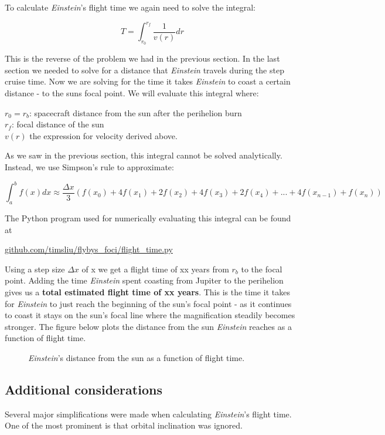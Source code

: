 \documentclass[12pt]{article} %
\begin{document}
To calculate \textit{Einstein}'s flight time we again need to solve the integral:

$$T = \int_{r_0}^{r_f} \frac{1}{v(r)} dr$$

This is the reverse of the problem we had in the previous section. In the last section we needed to solve for a distance that \textit{Einstein} travels during the step cruise time. Now we are solving for the time it takes \textit{Einstein} to coast a certain distance - to the suns focal point. We will evaluate this integral where:

$r_0 = r_b$: spacecraft distance from the sun after the perihelion burn\\
$r_f$: focal distance of the sun\\
$v(r)$ the expression for velocity derived above.

As we saw in the previous section, this integral cannot be solved analytically. Instead, we use Simpson's rule to approximate:

$$\int_a^b f(x) dx \approx \frac{\Delta x}{3} (f(x_0) + 4f(x_1)+ 2f(x_2) + 4f(x_3) + 2 f(x_4) + ... + 4f(x_{n-1}) + f(x_n))$$

The Python program used for numerically evaluating this integral can be found at 

\url{github.com/timsliu/flybys_foci/flight_time.py}

Using a step size $\Delta x$ of x we get a flight time of xx years from $r_b$ to the focal point. Adding the time \textit{Einstein} spent coasting from Jupiter to the perihelion gives us a \textbf{total estimated flight time of xx years}. This is the time it takes for \textit{Einstein} to just reach the beginning of the sun's focal point - as it continues to coast it stays on the sun's focal line where the magnification steadily becomes stronger. The figure below plots the distance from the sun \textit{Einstein} reaches as a function of flight time.

\begin{figure}[H]

	\caption{\textit{Einstein}'s distance from the sun as a function of flight time.}
\end{figure}

\subsection{Additional considerations}
Several major simplifications were made when calculating \textit{Einstein}'s flight time. One of the most prominent is that orbital inclination was ignored.
\end{document}
